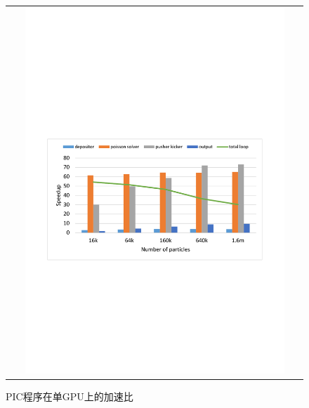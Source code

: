 \begin{figure}[!htb]
  \centering
  \begin{tabular}{|l|l|}
    \multicolumn{2}{c}{
    \includegraphics[width=0.9\textwidth]{Img/PIC_speedup_1GPU.pdf}} \\
  \end{tabular}
  \caption{PIC程序在单GPU上的加速比}
  \label{fig:PIC_speedup_1GPU}
\end{figure}

